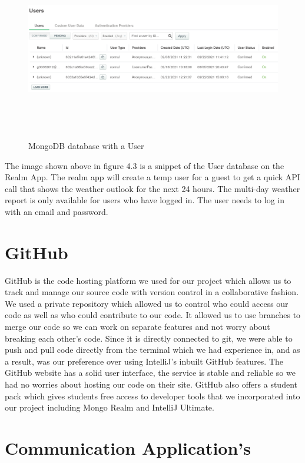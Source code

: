 \begin{figure}[H]
    \centering
    \includegraphics[width=15cm,height = 8cm]{img/Users.PNG}
    \caption{MongoDB database with a User}
    \label{fig:altas config}
\end{figure}
The image shown above in figure 4.3 is a snippet of the User database on the Realm App. The realm app will create a temp user for a guest to get a quick API call that shows the weather outlook for the next 24 hours. The multi-day weather report is only available for users who have logged in. The user needs to log in with an email and password.

\section{GitHub}
GitHub is the code hosting platform we used for our project which allows us to track and manage our source code with version control in a collaborative fashion. We used a private repository which allowed us to control who could access our code as well as who could contribute to our code. It allowed us to use branches to merge our code so we can work on separate features and not worry about breaking each other's code. \newpage
Since it is directly connected to git, we were able to push and pull code directly from the terminal which we had experience in, and as a result, was our preference over using IntelliJ's inbuilt GitHub features. The GitHub website has a solid user interface, the service is stable and reliable so we had no worries about hosting our code on their site. GitHub also offers a student pack which gives students free access to developer tools that we incorporated into our project including Mongo Realm and IntelliJ Ultimate.
\section{Communication Application's}
